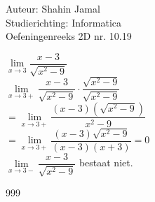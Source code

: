 \documentclass[a4paper]{article}
\begin{document}
  
\noindent \large Auteur: Shahin Jamal \\
\noindent \large Studierichting: Informatica\\
\noindent \large Oefeningenreeks 2D nr. 10.19\\

\medskip

\normalsize

$\lim\limits_{x \rightarrow 3} \dfrac{x-3}{\sqrt{x^2-9}}$\\ 

$\lim\limits_{x \rightarrow 3+} \dfrac{x-3}{\sqrt{x^2-9}} \cdot \dfrac{\sqrt{x^2-9}}{\sqrt{x^2-9}}$ \\

$= \lim\limits_{x \rightarrow 3+} \dfrac{(x-3)(\sqrt{x^2-9})}{x^2-9}$ \\

$= \lim\limits_{x \rightarrow 3+} \dfrac{(x-3)\sqrt{x^2-9}}{(x-3)(x+3)} = 0$\\ 

$\lim\limits_{x \rightarrow 3-} \dfrac{x-3}{\sqrt{x^2-9}}$ bestaat niet.

\begin{thebibliography}{999}
\end{thebibliography}
\end{document}
